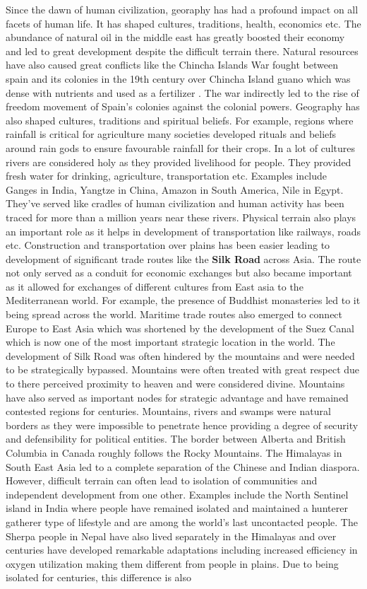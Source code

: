 Since the dawn of human civilization, georaphy has had a profound impact on all facets of human life. It has shaped cultures, traditions, health, economics etc. The abundance of natural oil in the middle east has greatly boosted their economy and led to great development despite the difficult terrain there. Natural resources have also caused great conflicts like the Chincha Islands War fought between spain and its colonies in the 19th century over Chincha Island guano which was dense with nutrients and used as a fertilizer \citep{sheldon2017french}. The war indirectly led to the rise of freedom movement of Spain's colonies against the colonial powers. Geography has also shaped cultures, traditions and spiritual beliefs. For example, regions where rainfall is critical for agriculture many societies developed rituals and beliefs around rain gods  to ensure favourable rainfall for their crops.  In a lot of cultures rivers are considered holy as they provided livelihood for people. They provided fresh water for drinking, agriculture, transportation etc. Examples include Ganges in India, Yangtze in China, Amazon in South America, Nile in Egypt. They've served like cradles of human civilization and human activity has been traced for more than a million years near these rivers. Physical terrain also plays an important role as it helps in development of transportation like railways, roads etc. Construction and transportation over plains has been easier leading to development of significant trade routes like the \textbf{Silk Road} across Asia. The route not only served as a conduit for economic exchanges but also became important as it allowed for exchanges of different cultures from East asia to the Mediterranean world. For example, the presence of Buddhist monasteries led to it being spread across the world. Maritime trade routes also emerged to connect Europe to East Asia which was shortened by the development of the Suez Canal which is now one of the most important strategic location in the world. The development of Silk Road was often hindered by the mountains and were needed to be strategically bypassed. Mountains were often treated with great respect due to there perceived proximity to heaven and were considered divine. Mountains have also served as important nodes for strategic advantage and have remained contested regions for centuries. Mountains, rivers and swamps were natural borders as they were impossible to penetrate hence providing a degree of security and defensibility for political entities. The border between Alberta and British Columbia in Canada roughly follows the Rocky Mountains.  The Himalayas in South East Asia led to a complete separation of the Chinese and Indian diaspora. However, difficult terrain can often lead to isolation of communities and independent development from one other. Examples include the North Sentinel island in India where people have remained isolated and maintained a hunterer gatherer type of lifestyle and are among the world's last uncontacted people. The Sherpa people in Nepal have also lived separately in the Himalayas and over centuries have developed remarkable adaptations including increased efficiency in oxygen utilization making them different from people in plains.  Due to being isolated for centuries, this difference is also 